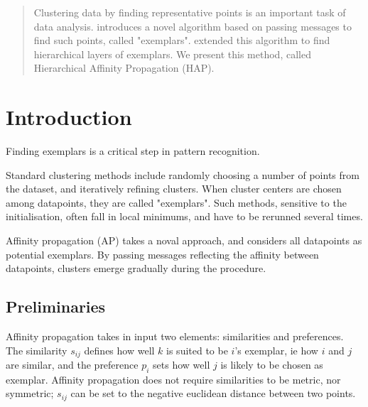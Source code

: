 \documentclass{ipol}
\begin{document}
\begin{abstract}

Clustering data by finding representative points is an important task of data
analysis. \cite{frey07affinitypropagation} introduces a novel algorithm based
on passing messages to find such points, called "exemplars". \cite{hap}
extended this algorithm to find hierarchical layers of exemplars. We present
this method, called Hierarchical Affinity Propagation (HAP).

\end{abstract}

\begin{ipolCode}
\end{ipolCode}

\begin{ipolSupp}
\end{ipolSupp}

\section{Introduction}

Finding exemplars is a critical step in pattern recognition.

Standard clustering methods include randomly choosing a number of points from
the dataset, and iteratively refining clusters. When cluster centers are
chosen among datapoints, they are called "exemplars". Such methods, sensitive to the
initialisation, often fall in local minimums, and have to be rerunned several
times.

Affinity propagation (AP) takes a noval approach, and considers all datapoints
as potential exemplars. By passing messages reflecting the affinity between
datapoints, clusters emerge gradually during the procedure.

\subsection{Preliminaries}

Affinity propagation takes in input two elements: similarities and
preferences. The similarity $s_{ij}$ defines how well $k$ is suited to be
$i$'s exemplar, ie how $i$ and $j$ are similar, and the preference $p_i$ sets
how well $j$ is likely to be chosen as exemplar. Affinity propagation does not
require similarities to be metric, nor symmetric; $s_{ij}$ can be set to the
negative euclidean distance between two points.
\end{document}
